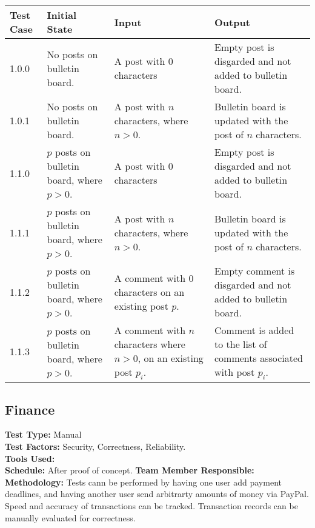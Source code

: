 \documentclass[12pt]{article}
\begin{document}
\begin{longtable}{|p{2cm}|p{3cm}|p{5cm}|p{5cm}|}
\hline
\textbf{Test Case} & \textbf{Initial State} & \textbf{Input} & \textbf{Output} \\ \hline
1.0.0 & No posts on bulletin board. & A post with 0 characters & Empty post is disgarded and not added to bulletin board.\\
\hline
1.0.1 & No posts on bulletin board. & A post with $n$ characters, where $n > 0$. & Bulletin board is updated with the post of $n$ characters.\\
\hline
1.1.0 & $p$ posts on bulletin board, where $p > 0$. & A post with 0 characters & Empty post is disgarded and not added to bulletin board.\\
\hline
1.1.1 & $p$ posts on bulletin board, where $p > 0$. & A post with $n$ characters, where $n > 0$. & Bulletin board is updated with the post of $n$ characters.\\
\hline
1.1.2 & $p$ posts on bulletin board, where $p > 0$. & A comment with 0 characters on an existing post $p$. & Empty comment is disgarded and not added to bulletin board.\\
\hline
1.1.3 & $p$ posts on bulletin board, where $p > 0$. & A comment with $n$ characters where $n > 0$, on an existing post $p_i$. & Comment is added to the list of comments associated with post $p_i$.\\
\hline
\end{longtable}
  
\subsection{Finance}
\textbf{Test Type:} Manual\\
\textbf{Test Factors:} Security, Correctness, Reliability. \\
\textbf{Tools Used:} \\
\textbf{Schedule:} After proof of concept.
\textbf{Team Member Responsible:} \\
\textbf{Methodology:} Tests cann be performed by having one user add payment deadlines, and having another user send arbitrarty amounts of money via PayPal. Speed and accuracy of transactions can be tracked. Transaction records can be manually evaluated for correctness.
\end{document}
